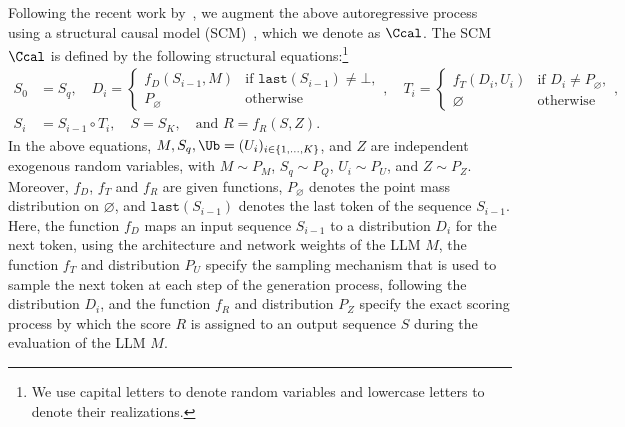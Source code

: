 Following the recent work by~\citet{chatzi2024counterfactual}, we augment the above autoregressive process using a structural causal model (SCM)~\citep{pearl2009causality, peters2017elements}, which we denote as $\Ccal$. 
%
The SCM $\Ccal$ is defined by the following structural equations:\footnote{We use capital letters to denote random variables and lowercase letters to denote their realizations.}
%
\begin{equation}\label{eq:SCM}
\begin{split}
           S_0&=S_q,
    \quad   D_{i} 
 =\begin{cases}
        f_D(S_{i-1},M)
        & \text{if} \,\, \texttt{last}(S_{i-1})\neq \bot,\\
        P_\varnothing & \text{otherwise}
    \end{cases},
    \quad  T_{i} = \begin{cases}
        f_T( D_{i}, U_{i}) & \text{if} \,\, D_{i} \neq P_\varnothing,\\
        \varnothing & \text{otherwise}
    \end{cases},
        \\[2ex] 
    S_{i} &=  
    S_{i-1} \circ T_{i}, 
    \quad S=S_K,
    \quad \text{and } R=f_R(S, Z).
\end{split}
\end{equation}
%
In the above equations, $M,S_q,\Ub = (U_i)_{i \in \{1, \ldots, K\}}$, and $Z$ are independent exogenous random variables, 
%
with $M \sim P_{M}$, $S_q \sim P_{Q}$, $U_i \sim P_{U}$, and $Z \sim P_{Z}$.
%
Moreover, $f_D$, $f_T$ and $f_R$ are given functions,
%
$P_\varnothing$ denotes the point mass distribution on $\varnothing$, and $\texttt{last}(S_{i-1})$ denotes the last token of the sequence $S_{i-1}$. 
%
Here, the function $f_D$ maps an input sequence $S_{i-1}$ to a distribution $D_i$ for the next token, using the architecture and network weights of the LLM $M$, 
%
the function $f_T$ and distribution $P_U$ specify the sampling mechanism that is used to sample the next token at each step of the generation process, following the distribution $D_i$,
%
and the function $f_R$ and distribution $P_Z$ specify the exact scoring process by which the score $R$ is assigned to an output sequence $S$ during the evaluation of the LLM $M$.
%

